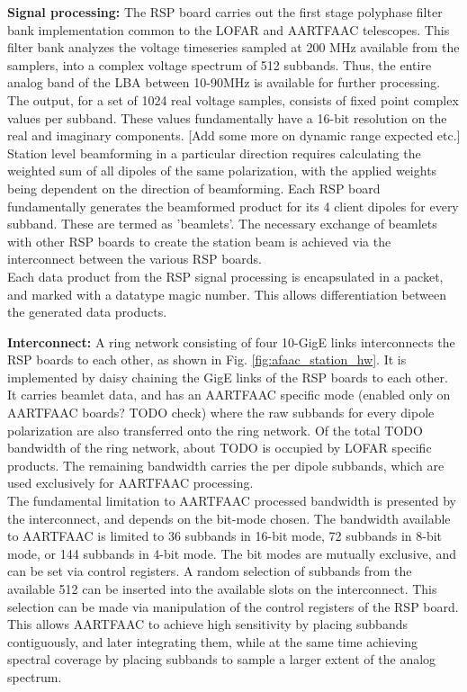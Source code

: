 \documentclass{aa}
\begin{document}
\textbf {Signal processing:} The RSP board carries out the first stage polyphase
filter bank  implementation common  to the LOFAR  and AARTFAAC  telescopes. This
filter bank  analyzes the voltage timeseries  sampled at 200 MHz  available from
the samplers, into a complex voltage  spectrum of 512 subbands. Thus, the entire
analog band of the LBA between 10-90MHz is available for further processing. The
output, for a set of 1024 real  voltage samples, consists of fixed point complex
values per subband.  These values fundamentally have a 16-bit  resolution on the
real and imaginary components. [Add some more on dynamic range expected etc.]\\

Station level  beamforming in  a particular  direction requires  calculating the
weighted sum of  all dipoles of the same polarization,  with the applied weights
being dependent on  the direction of beamforming.  Each  RSP board fundamentally
generates the  beamformed product for  its 4  client dipoles for  every subband.
These are termed  as 'beamlets'.  The necessary exchange of  beamlets with other
RSP boards to  create the station beam is achieved  via the interconnect between
the various RSP boards.\\

Each data  product from the RSP  signal processing is encapsulated  in a packet,
and marked with a datatype magic number. This allows differentiation between the
generated data products.

\textbf  {Interconnect:}  A  ring  network  consisting  of  four  10-GigE  links
interconnects    the    RSP   boards    to    each    other,   as    shown    in
Fig. \ref{fig:afaac_station_hw}.  It is implemented  by daisy chaining  the GigE
links of  the RSP  boards to  each other. It  carries beamlet  data, and  has an
AARTFAAC specific mode  (enabled only on AARTFAAC boards? TODO  check) where the
raw subbands  for every dipole polarization  are also transferred onto  the ring
network. Of the total TODO bandwidth of the ring network, about TODO is occupied
by  LOFAR specific  products. The  remaining  bandwidth carries  the per  dipole
subbands, which are used exclusively for AARTFAAC processing.\\

The fundamental limitation  to AARTFAAC processed bandwidth is  presented by the
interconnect, and  depends on the  bit-mode chosen.  The bandwidth  available to
AARTFAAC is limited to 36 subbands in 16-bit mode, 72 subbands in 8-bit mode, or
144 subbands in 4-bit mode. The bit modes are mutually exclusive, and can be set
via control  registers.  A random selection  of subbands from the  available 512
can be inserted into the available slots on the interconnect. This selection can
be made via manipulation of the control registers of the RSP board.  This allows
AARTFAAC to achieve high sensitivity by placing subbands contiguously, and later
integrating them, while at the same  time achieving spectral coverage by placing
subbands to sample a larger extent of the analog spectrum.
\end{document}
